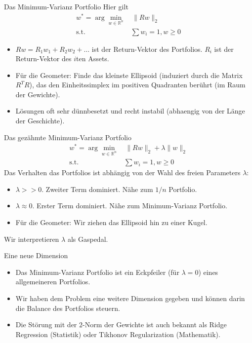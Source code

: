 \documentclass[10pt]{beamer}
\newcommand{\R}{\mathbb R}
\providecommand{\norm}[1]{\lVert#1\rVert}
\begin{document}
\begin{frame}{Das Minimum-Varianz Portfolio}
Hier gilt
\begin{align}
w^*=\arg\min_{w\in\R^n}&\, \norm{Rw}_2 \\
\text{s.t. }&\sum w_i = 1, w\geq 0\nonumber
\end{align}

\begin{itemize}
\item $Rw = R_1 w_1 + R_2 w_2 + \ldots$ ist der Return-Vektor des Portfolios. $R_i$ ist der Return-Vektor des $i$ten Assets.
\item Für die Geometer: Finde das kleinste Ellipsoid (induziert durch die Matrix $R^T R$), das den Einheitssimplex im positiven Quadranten berührt (im Raum der Gewichte).
\item Lösungen oft sehr dünnbesetzt und recht instabil (abhaengig von der Länge der Geschichte).
\end{itemize}
\end{frame}


\begin{frame}{Das gezähmte Minimum-Varianz Portfolio}
\begin{align}
w^*=\arg\min_{w\in\R^n}&\, \norm{Rw}_2 + \lambda \norm{w}_2 \\
\text{s.t. }&\sum w_i = 1, w\geq 0\nonumber
\end{align}
Das Verhalten das Portfolios ist abhängig von der Wahl des freien Parameters $\lambda$:
\begin{itemize}
\item $\lambda >> 0$. Zweiter Term dominiert. Nähe zum $1/n$ Portfolio.
\item $\lambda \approx 0$. Erster Term dominiert. Nähe zum Minimum-Varianz Portfolio.
\item Für die Geometer: Wir ziehen das Ellipsoid hin zu einer Kugel.
\end{itemize}
Wir interpretieren $\lambda$ als Gaspedal. 
\end{frame}

\begin{frame}{Eine neue Dimension}
\begin{itemize}
\item Das Minimum-Varianz Portfolio ist ein Eckpfeiler (für $\lambda = 0$) eines allgemeineren Portfolios.
\item Wir haben dem Problem eine weitere Dimension gegeben und können darin die Balance des Portfolios steuern. 
\item Die Störung mit der $2$-Norm der Gewichte ist auch bekannt als Ridge Regression (Statistik) oder Tikhonov Regularization (Mathematik).
\end{itemize}
\end{frame}
\end{document}

